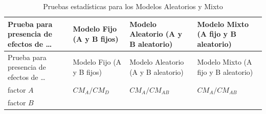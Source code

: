 \documentclass[]{book}
\theoremstyle{definition}
\theoremstyle{definition}
\theoremstyle{definition}
\theoremstyle{remark}
\begin{document}
\begin{longtable}[]{@{}llll@{}}
\caption{\label{tab:mixto-aleatorio} Pruebas estadísticas para los Modelos
Aleatorios y Mixto}\tabularnewline
\toprule
\begin{minipage}[b]{0.26\columnwidth}\raggedright
Prueba para presencia de efectos de \ldots{}\strut
\end{minipage} & \begin{minipage}[b]{0.17\columnwidth}\raggedright
Modelo Fijo (A y B fijos)\strut
\end{minipage} & \begin{minipage}[b]{0.23\columnwidth}\raggedright
Modelo Aleatorio (A y B aleatorio)\strut
\end{minipage} & \begin{minipage}[b]{0.23\columnwidth}\raggedright
Modelo Mixto (A fijo y B aleatorio)\strut
\end{minipage}\tabularnewline
\midrule
\endfirsthead
\toprule
\begin{minipage}[b]{0.26\columnwidth}\raggedright
Prueba para presencia de efectos de \ldots{}\strut
\end{minipage} & \begin{minipage}[b]{0.17\columnwidth}\raggedright
Modelo Fijo (A y B fijos)\strut
\end{minipage} & \begin{minipage}[b]{0.23\columnwidth}\raggedright
Modelo Aleatorio (A y B aleatorio)\strut
\end{minipage} & \begin{minipage}[b]{0.23\columnwidth}\raggedright
Modelo Mixto (A fijo y B aleatorio)\strut
\end{minipage}\tabularnewline
\midrule
\endhead
\begin{minipage}[t]{0.26\columnwidth}\raggedright
factor \(A\)\strut
\end{minipage} & \begin{minipage}[t]{0.17\columnwidth}\raggedright
\(CM_{A}/CM_{D}\)\strut
\end{minipage} & \begin{minipage}[t]{0.23\columnwidth}\raggedright
\(CM_{A}/CM_{AB}\)\strut
\end{minipage} & \begin{minipage}[t]{0.23\columnwidth}\raggedright
\(CM_{A}/CM_{AB}\)\strut
\end{minipage}\tabularnewline
\begin{minipage}[t]{0.26\columnwidth}\raggedright
factor \(B\)\strut
\end{minipage} & \begin{minipage}[t]{0.17\columnwidth}\raggedright

\end{minipage}
\end{longtable}
\end{document}

